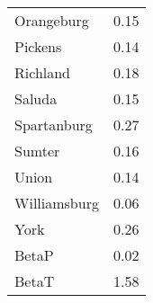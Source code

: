\begin{tabular}{lr}
  Orangeburg &      0.15 \\
     Pickens &      0.14 \\
    Richland &      0.18 \\
      Saluda &      0.15 \\
 Spartanburg &      0.27 \\
      Sumter &      0.16 \\
       Union &      0.14 \\
Williamsburg &      0.06 \\
        York &      0.26 \\
       BetaP &      0.02 \\
       BetaT &      1.58 \\
\bottomrule
\end{tabular}
